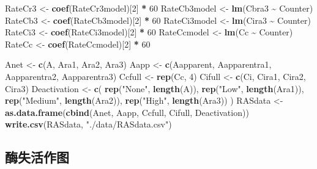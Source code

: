 \documentclass[
]{krantz}
\makeatletter
\newenvironment{Shaded}{\begin{snugshade}}{\end{snugshade}}
\newcommand{\DecValTok}[1]{\textcolor[rgb]{0.00,0.00,0.81}{#1}}
\newcommand{\KeywordTok}[1]{\textcolor[rgb]{0.13,0.29,0.53}{\textbf{#1}}}
\newcommand{\NormalTok}[1]{#1}
\newcommand{\OperatorTok}[1]{\textcolor[rgb]{0.81,0.36,0.00}{\textbf{#1}}}
\newcommand{\StringTok}[1]{\textcolor[rgb]{0.31,0.60,0.02}{#1}}
\newenvironment{kframe}{%
\medskip{}
\setlength{\fboxsep}{.8em}
 \def\at@end@of@kframe{}%
 \ifinner\ifhmode%
  \def\at@end@of@kframe{\end{minipage}}%
  \begin{minipage}{\columnwidth}%
 \fi\fi%
 \def\FrameCommand##1{\hskip\@totalleftmargin \hskip-\fboxsep
 \colorbox{shadecolor}{##1}\hskip-\fboxsep
     \hskip-\linewidth \hskip-\@totalleftmargin \hskip\columnwidth}%
 \MakeFramed {\advance\hsize-\width
   \@totalleftmargin\z@ \linewidth\hsize
   \@setminipage}}%
 {\par\unskip\endMakeFramed%
 \at@end@of@kframe}
\renewenvironment{Shaded}{\begin{kframe}}{\end{kframe}}
\makeatother
\begin{document}
\begin{Shaded}
\begin{Highlighting}[]
\NormalTok{RateCr3 \textless{}{-}}\StringTok{ }\KeywordTok{coef}\NormalTok{(RateCr3model)[}\DecValTok{2}\NormalTok{] }\OperatorTok{*}\StringTok{ }\DecValTok{60} 
\NormalTok{RateCb3model \textless{}{-}}\StringTok{ }\KeywordTok{lm}\NormalTok{(Cbra3 }\OperatorTok{\textasciitilde{}}\StringTok{ }\NormalTok{Counter)}
\NormalTok{RateCb3 \textless{}{-}}\StringTok{ }\KeywordTok{coef}\NormalTok{(RateCb3model)[}\DecValTok{2}\NormalTok{] }\OperatorTok{*}\StringTok{ }\DecValTok{60} 
\NormalTok{RateCi3model \textless{}{-}}\StringTok{ }\KeywordTok{lm}\NormalTok{(Cira3 }\OperatorTok{\textasciitilde{}}\StringTok{ }\NormalTok{Counter)}
\NormalTok{RateCi3 \textless{}{-}}\StringTok{ }\KeywordTok{coef}\NormalTok{(RateCi3model)[}\DecValTok{2}\NormalTok{] }\OperatorTok{*}\StringTok{ }\DecValTok{60} 
\NormalTok{RateCcmodel \textless{}{-}}\StringTok{ }\KeywordTok{lm}\NormalTok{(Cc }\OperatorTok{\textasciitilde{}}\StringTok{ }\NormalTok{Counter)}
\NormalTok{RateCc \textless{}{-}}\StringTok{ }\KeywordTok{coef}\NormalTok{(RateCcmodel)[}\DecValTok{2}\NormalTok{] }\OperatorTok{*}\StringTok{ }\DecValTok{60} 

\NormalTok{Anet \textless{}{-}}\StringTok{ }\KeywordTok{c}\NormalTok{(A, Ara1, Ara2, Ara3)}
\NormalTok{Aapp \textless{}{-}}\StringTok{ }\KeywordTok{c}\NormalTok{(Aapparent, Aapparentra1, Aapparentra2, Aapparentra3)}
\NormalTok{Ccfull \textless{}{-}}\StringTok{ }\KeywordTok{rep}\NormalTok{(Cc, }\DecValTok{4}\NormalTok{)}
\NormalTok{Cifull \textless{}{-}}\StringTok{ }\KeywordTok{c}\NormalTok{(Ci, Cira1, Cira2, Cira3)}
\NormalTok{Deactivation \textless{}{-}}
\StringTok{  }\KeywordTok{c}\NormalTok{(}
    \KeywordTok{rep}\NormalTok{(}\StringTok{"None"}\NormalTok{, }\KeywordTok{length}\NormalTok{(A)),}
    \KeywordTok{rep}\NormalTok{(}\StringTok{"Low"}\NormalTok{, }\KeywordTok{length}\NormalTok{(Ara1)),}
    \KeywordTok{rep}\NormalTok{(}\StringTok{"Medium"}\NormalTok{, }\KeywordTok{length}\NormalTok{(Ara2)),}
    \KeywordTok{rep}\NormalTok{(}\StringTok{"High"}\NormalTok{, }\KeywordTok{length}\NormalTok{(Ara3))}
\NormalTok{  )}
\NormalTok{RASdata \textless{}{-}}
\StringTok{  }\KeywordTok{as.data.frame}\NormalTok{(}\KeywordTok{cbind}\NormalTok{(Anet, Aapp, Ccfull, Cifull, Deactivation))}
\KeywordTok{write.csv}\NormalTok{(RASdata, }\StringTok{"./data/RASdata.csv"}\NormalTok{)}
\end{Highlighting}
\end{Shaded}

\hypertarget{multi9}{%
\subsection{酶失活作图}\label{multi9}}
\end{document}
